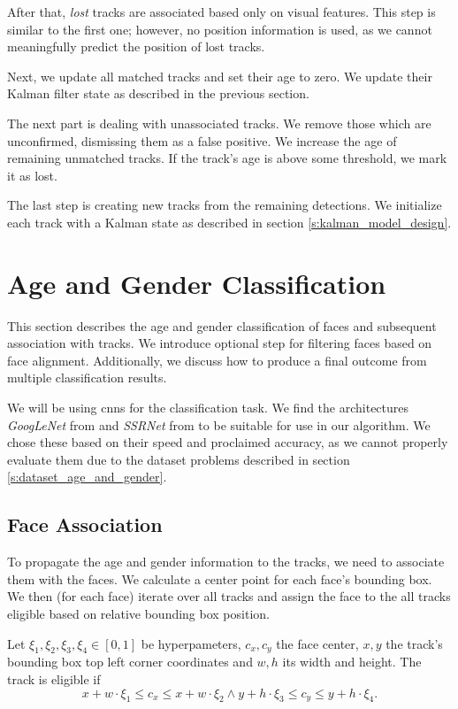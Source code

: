 After that, \textit{lost} tracks are associated based only on visual features. This step is similar to the first one; however, no position information is used, as we cannot meaningfully predict the position of lost tracks.

Next, we update all matched tracks and set their age to zero. We update their Kalman filter state as described in the previous section.

The next part is dealing with unassociated tracks. We remove those which are unconfirmed, dismissing them as a false positive. We increase the age of remaining unmatched tracks. If the track's age is above some threshold, we mark it as lost.

The last step is creating new tracks from the remaining detections. We initialize each track with a Kalman state as described in section \ref{s:kalman_model_design}.

\section{Age and Gender Classification}

This section describes the age and gender classification of faces and subsequent association with tracks. We introduce optional step for filtering faces based on face alignment. Additionally, we discuss how to produce a final outcome from multiple classification results.

We will be using \glspl{cnn} for the classification task. We find the architectures \textit{GoogLeNet} from \cite{szegedy2015going_googlenet} and \textit{SSRNet} from \cite{yang2018ssr} to be suitable for use in our algorithm. We chose these based on their speed and proclaimed accuracy, as we cannot properly evaluate them due to the dataset problems described in section \ref{s:dataset_age_and_gender}.

\subsection{Face Association}

To propagate the age and gender information to the tracks, we need to associate them with the faces. We calculate a center point for each face's bounding box. We then (for each face) iterate over all tracks and assign the face to the all tracks eligible based on relative bounding box position.

\newcommand{\idkletter}{\xi}
Let $\idkletter_1, \idkletter_2, \idkletter_3, \idkletter_4 \in [0,1]$ be hyperpameters, $c_x, c_y$ the face center, $x, y$ the track's bounding box top left corner coordinates and $w, h$ its width and height. The track is eligible if
$$
x + w \cdot \idkletter_1 \leq c_x \leq x + w \cdot \idkletter_2 \land y + h \cdot \idkletter_3 \leq c_y \leq y  + h \cdot \idkletter_4. 
$$

